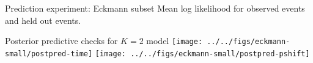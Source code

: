 \documentclass{beamer}
\begin{document}
\begin{frame}{Prediction experiment: Eckmann subset}
Mean log likelihood for observed events and held out events.

\end{frame}

\begin{frame}{Posterior predictive checks for $K=2$ model}
\texttt{[image: ../../figs/eckmann-small/postpred-time]}
\texttt{[image: ../../figs/eckmann-small/postpred-pshift]}
\end{frame}




\end{document}
